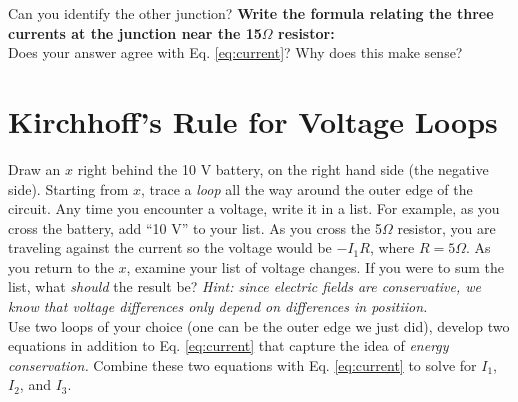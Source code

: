 \documentclass[12pt]{article}
\begin{document}
Can you identify the other junction?  \textbf{Write the formula relating the three currents at the junction near the 15$\Omega$ resistor:} \\

Does your answer agree with Eq. \ref{eq:current}?  Why does this make sense? \\

\section{Kirchhoff's Rule for Voltage Loops}

Draw an $x$ right behind the 10 V battery, on the right hand side (the negative side).  Starting from $x$, trace a \textit{loop} all the way around the outer edge of the circuit.  Any time you encounter a voltage, write it in a list.  For example, as you cross the battery, add ``10 V'' to your list.  As you cross the 5$\Omega$ resistor, you are traveling against the current so the voltage would be $-I_1 R$, where $R = 5\Omega$.  As you return to the $x$, examine your list of voltage changes.  If you were to sum the list, what \textit{should} the result be?  \textit{Hint: since electric fields are conservative, we know that voltage differences only depend on differences in positiion.} \\

Use two loops of your choice (one can be the outer edge we just did), develop two equations in addition to Eq. \ref{eq:current} that capture the idea of \textit{energy conservation.}  Combine these two equations with Eq. \ref{eq:current} to solve for $I_1$, $I_2$, and $I_3$.
\end{document}
